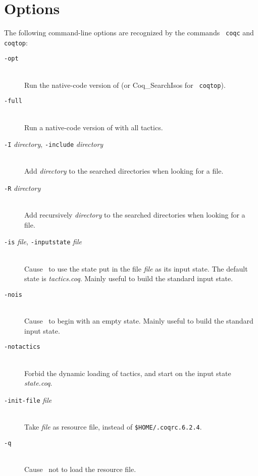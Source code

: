\section{Options}

The following command-line options are recognized by the commands {\tt
  coqc} and {\tt coqtop}:

\begin{description}
\item[{\tt -opt}]\ \\
  Run the native-code version of \Coq{} (or {\sf Coq\_SearchIsos} for {\tt
coqtop}).

\item[{\tt -full}]\ \\
  Run a native-code version of {\Coq} with all tactics.

\item[{\tt -I} {\em directory}, {\tt -include} {\em directory}]\ \\
  Add {\em directory} to the searched directories when looking for a
  file.

\item[{\tt -R} {\em directory}]\ \\
  Add recursively {\em directory} to the searched directories when looking for
  a file.

\item[{\tt -is} {\em file}, {\tt -inputstate} {\em file}]\ \\
  Cause \Coq~to use the state put in the file {\em file} as its input
  state. The default state is {\em tactics.coq}.
  Mainly useful to build the standard input state.

\item[{\tt -nois}]\ \\
  Cause \Coq~to begin with an empty state. Mainly useful to build the
  standard input state.

\item[{\tt -notactics}]\ \\
  Forbid the dynamic loading of tactics, and start on the input state
  {\em state.coq}.

\item[{\tt -init-file} {\em file}]\ \\
  Take {\em file} as resource file, instead of {\tt \$HOME/.coqrc.6.2.4}.

\item[{\tt -q}]\ \\
  Cause \Coq~not to load the resource file.


\end{description}
